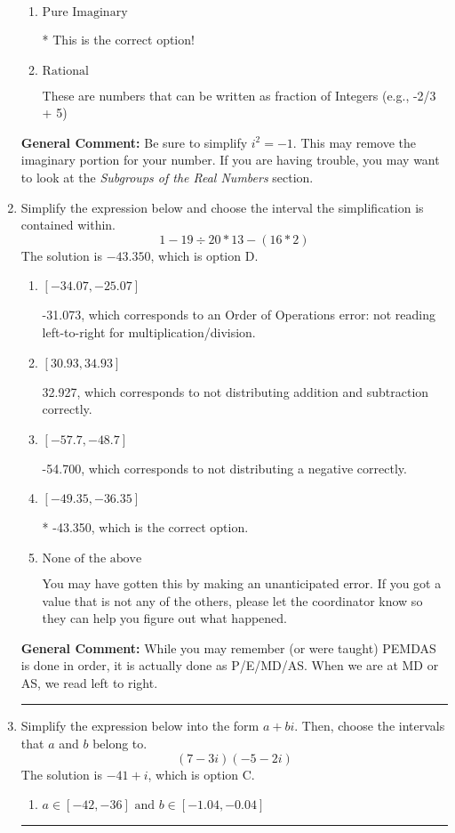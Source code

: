 \documentclass{extbook}[14pt]
\newcommand{\litem}[1]{\item #1

\rule{\textwidth}{0.4pt}}
\begin{document}
\begin{enumerate}
{\begin{enumerate}[label=\Alph*.]
These cannot be written as a fraction of Integers. Remember: $\pi$ is not an Integer!
\item \( \text{Pure Imaginary} \)

* This is the correct option!
\item \( \text{Rational} \)

These are numbers that can be written as fraction of Integers (e.g., -2/3 + 5)
\end{enumerate}

\textbf{General Comment:} Be sure to simplify $i^2 = -1$. This may remove the imaginary portion for your number. If you are having trouble, you may want to look at the \textit{Subgroups of the Real Numbers} section.
}
\litem{
Simplify the expression below and choose the interval the simplification is contained within.
\[ 1 - 19 \div 20 * 13 - (16 * 2) \]The solution is \( -43.350 \), which is option D.\begin{enumerate}[label=\Alph*.]
\item \( [-34.07, -25.07] \)

 -31.073, which corresponds to an Order of Operations error: not reading left-to-right for multiplication/division.
\item \( [30.93, 34.93] \)

 32.927, which corresponds to not distributing addition and subtraction correctly.
\item \( [-57.7, -48.7] \)

 -54.700, which corresponds to not distributing a negative correctly.
\item \( [-49.35, -36.35] \)

* -43.350, which is the correct option.
\item \( \text{None of the above} \)

 You may have gotten this by making an unanticipated error. If you got a value that is not any of the others, please let the coordinator know so they can help you figure out what happened.
\end{enumerate}

\textbf{General Comment:} While you may remember (or were taught) PEMDAS is done in order, it is actually done as P/E/MD/AS. When we are at MD or AS, we read left to right.
}
\litem{
Simplify the expression below into the form $a+bi$. Then, choose the intervals that $a$ and $b$ belong to.
\[ (7 - 3 i)(-5 - 2 i) \]The solution is \( -41 + i \), which is option C.\begin{enumerate}[label=\Alph*.]
\item \( a \in [-42, -36] \text{ and } b \in [-1.04, -0.04] \)


\end{enumerate}}
\end{enumerate}
\end{document}
